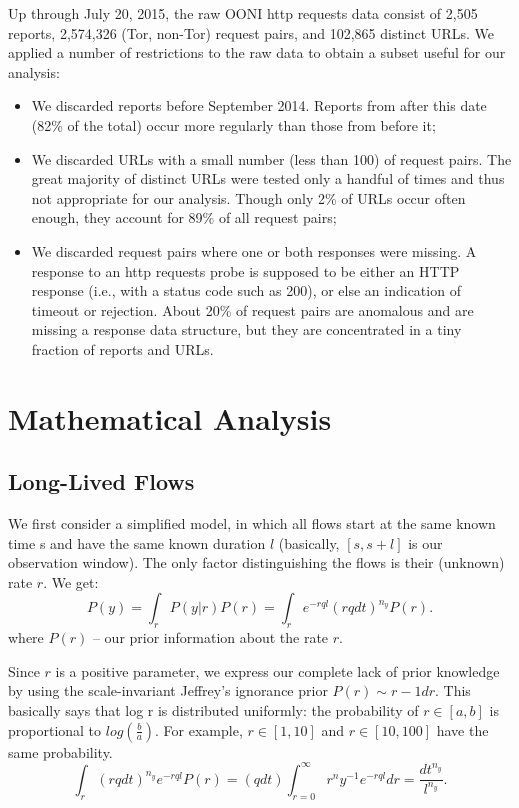 \documentclass[12pt]{spieman}
\begin{document}
\begin{spacing}{2}
Up through July 20, 2015, the raw OONI http requests data consist of 2,505 reports, 2,574,326 (Tor, non-Tor) request pairs, and 102,865 distinct URLs. We applied a number of restrictions to the raw data to obtain a subset useful for our analysis:
\begin{itemize}
\item We discarded reports before September 2014. Reports from after this date (82\% of the total) occur more regularly than those from before it;
\item We discarded URLs with a small number (less than 100) of request pairs. The great majority of distinct URLs were tested only a handful of times and thus not appropriate for our analysis. Though only 2\% of URLs occur often enough, they account for 89\% of all request pairs;
\item We discarded request pairs where one or both responses were missing. A response to an http requests probe is supposed to be either an HTTP response (i.e., with a status code such as 200), or else an indication of timeout or rejection. About 20\% of request pairs are anomalous and are missing a response data structure, but they are concentrated in a tiny fraction of reports and URLs.
\end{itemize}

\section{Mathematical Analysis}
\subsection{Long-Lived Flows}
We first consider a simplified model, in which all flows start at the same known time s and have the same known duration $l$ (basically, $[s,s+l]$ is our observation window). The only factor distinguishing the flows is their (unknown) rate $r$. We get:
\begin{equation}
\label{1}
P(y) = \int_{r}^{} P(y|r)P(r)= \int_{r}^{} e^{-rql} (rq dt)^{n_{y}}P(r).
\end{equation}
where $P(r)$ – our prior information about the rate $r$.  

Since $r$ is a positive parameter, we express our complete lack of prior knowledge by using the scale-invariant Jeffrey’s ignorance prior $P(r) 
\sim r -1 dr$. This basically says that log r is distributed uniformly: the probability of $r \in [a,b]$ is proportional to $log(\frac{b}{a})$. For example, $r \in [1,10]$ and $r \in [10,100]$ have the same probability.
\begin{equation}
\label{2}
\int_{r}^{} (rq dt)^{n_{y}} e^{-rql} P(r) = (q dt) \int_{r=0}^{\infty} r^{n} y^{-1} e^{-rql} dr = \frac{dt^{n_{y}}}{l^{n_{y}}}.
\end{equation}


\end{spacing}
\end{document}
